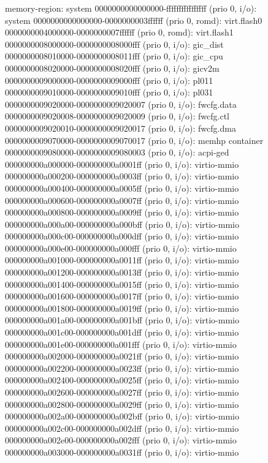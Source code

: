 \begin{figure}[ht]
\begin{minipage}{0.48\linewidth}
\begin{ffcode}
    memory-region: system
      0000000000000000-ffffffffffffffff (prio 0, i/o): system
        0000000000000000-0000000003ffffff (prio 0, romd): virt.flash0
        0000000004000000-0000000007ffffff (prio 0, romd): virt.flash1
        0000000008000000-0000000008000fff (prio 0, i/o): gic_dist
        0000000008010000-0000000008011fff (prio 0, i/o): gic_cpu
        0000000008020000-0000000008020fff (prio 0, i/o): gicv2m
        0000000009000000-0000000009000fff (prio 0, i/o): pl011
        0000000009010000-0000000009010fff (prio 0, i/o): pl031
        0000000009020000-0000000009020007 (prio 0, i/o): fwcfg.data
        0000000009020008-0000000009020009 (prio 0, i/o): fwcfg.ctl
        0000000009020010-0000000009020017 (prio 0, i/o): fwcfg.dma
        0000000009070000-0000000009070017 (prio 0, i/o): memhp container
        0000000009080000-0000000009080003 (prio 0, i/o): acpi-ged
        000000000a000000-000000000a0001ff (prio 0, i/o): virtio-mmio
        000000000a000200-000000000a0003ff (prio 0, i/o): virtio-mmio
        000000000a000400-000000000a0005ff (prio 0, i/o): virtio-mmio
        000000000a000600-000000000a0007ff (prio 0, i/o): virtio-mmio
        000000000a000800-000000000a0009ff (prio 0, i/o): virtio-mmio
        000000000a000a00-000000000a000bff (prio 0, i/o): virtio-mmio
        000000000a000c00-000000000a000dff (prio 0, i/o): virtio-mmio
        000000000a000e00-000000000a000fff (prio 0, i/o): virtio-mmio
        000000000a001000-000000000a0011ff (prio 0, i/o): virtio-mmio
        000000000a001200-000000000a0013ff (prio 0, i/o): virtio-mmio
        000000000a001400-000000000a0015ff (prio 0, i/o): virtio-mmio
        000000000a001600-000000000a0017ff (prio 0, i/o): virtio-mmio
        000000000a001800-000000000a0019ff (prio 0, i/o): virtio-mmio
        000000000a001a00-000000000a001bff (prio 0, i/o): virtio-mmio
        000000000a001c00-000000000a001dff (prio 0, i/o): virtio-mmio
        000000000a001e00-000000000a001fff (prio 0, i/o): virtio-mmio
        000000000a002000-000000000a0021ff (prio 0, i/o): virtio-mmio
        000000000a002200-000000000a0023ff (prio 0, i/o): virtio-mmio
        000000000a002400-000000000a0025ff (prio 0, i/o): virtio-mmio
        000000000a002600-000000000a0027ff (prio 0, i/o): virtio-mmio
        000000000a002800-000000000a0029ff (prio 0, i/o): virtio-mmio
        000000000a002a00-000000000a002bff (prio 0, i/o): virtio-mmio
        000000000a002c00-000000000a002dff (prio 0, i/o): virtio-mmio
        000000000a002e00-000000000a002fff (prio 0, i/o): virtio-mmio
        000000000a003000-000000000a0031ff (prio 0, i/o): virtio-mmio

\end{ffcode}
\end{minipage}
\end{figure}
